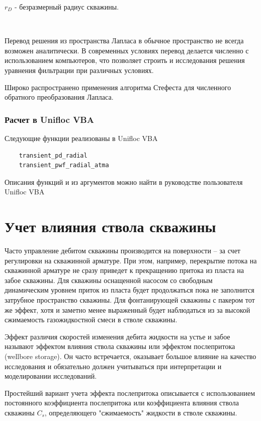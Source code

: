 $r_D$ - безразмерный радиус скважины.

\

Перевод решения из пространства Лапласа в обычное пространство не всегда возможен аналитически. В современных условиях перевод делается численно с использованием компьютеров, что позволяет строить и исследования решения уравнения фильтрации при различных условиях. 

Широко распространено применения алгоритма Стефеста для численного обратного преобразования Лапласа. 

\subsubsection{Расчет в Unifloc VBA}

Следующие функции реализованы в Unifloc VBA

\begin{verbatim}
	transient_pd_radial
	transient_pwf_radial_atma
\end{verbatim}	

Описания функций и из аргументов можно найти в руководстве пользователя  Unifloc VBA

\section{Учет влияния ствола скважины}
Часто управление дебитом скважины производится на поверхности -- за счет регулировки на скважинной арматуре. При этом, например, перекрытие потока на скважинной арматуре не сразу приведет к прекращению притока из пласта на забое скважины. Для скважины оснащенной насосом со свободным динамическим уровнем приток из пласта будет продолжаться пока не заполнится затрубное пространство скважины. Для фонтанирующей скважины с пакером тот же эффект, хотя и заметно менее выраженный будет наблюдаться из за высокой сжимаемость газожидкостной смеси в стволе скважины. 

Эффект различия скоростей изменения дебита жидкости на устье и забое называют эффектом влияния ствола скважины или эффектом послепритока (wellbore storage). Он часто встречается, оказывает большое влияние на качество исследования и обязательно должен учитываться при интерпретации и моделировании исследований.

Простейший вариант учета эффекта послепритока описывается с использованием постоянного коэффициента послепритока или коэффициента влияния ствола скважины $C_s$, определяющего "сжимаемость" жидкости в стволе скважины.

